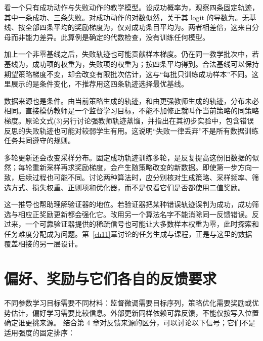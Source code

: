 看一个只有成功动作与失败动作的教学模型。设成功概率为，观察四条固定轨迹，其中一条成功、三条失败。对成功动作的对数似然，关于其 logit 的导数为。无基线、按全部四条平均的奖励梯度为，仅对成功条目平均为。两者相差倍，这来自分母而非能力差异。此算例是确定的代数检查，没有训练任何模型。

加上一个非零基线之后，失败轨迹也可能贡献样本梯度。仍在同一教学批次中，若基线为，成功项的权重为，失败项的权重为；按四条平均得到。合法基线可以保持期望策略梯度不变，却会改变有限批次估计，这与“每批只训练成功样本”不同。这里展示的是条件变化，不推荐用这四条轨迹选择最优基线。

数据来源也是条件。由当前策略生成的轨迹，和由更强教师生成的轨迹，分布未必相同。直接模仿教师是一个监督学习目标，不能不加修正就叫作当前策略的同策略梯度。原论文式(3)另行讨论强教师轨迹蒸馏，并指出在其初步实验中，包含错误反思的失败轨迹也可能对较弱学生有用\cite{self-challenging-2506}。这说明“失败一律丢弃”不是所有数据训练任务共同遵守的规则。

多轮更新还会改变采样分布。固定成功轨迹训练多轮，是反复提高这份旧数据的似然；每轮重新采样再求奖励梯度，会产生随策略改变的新数据。即使第一步方向一致，后续过程也可能不同。讨论两种算法时，应分别核对生成策略、采样频率、筛选方式、损失权重、正则项和优化器，而不是仅看它们是否都使用二值奖励。

这一推导也帮助理解验证器的地位。若验证器把某种错误轨迹误判为成功，成功筛选与相应正奖励更新都会强化它。改用另一个算法名字不能消除同一反馈错误。反过来，一个可靠验证器提供的稀疏信号也可能让大多数样本权重为零，此时探索和任务难度分配成为问题。第~\ref{ch11}章讨论的任务生成与课程，正是与这里的数据覆盖相接的另一层设计。

\section{偏好、奖励与它们各自的反馈要求}
\label{sec:ch10-reward}

\begin{sloppypar}
不同参数学习目标需要不同材料：监督微调需要目标序列，策略优化需要奖励或优势估计，偏好学习需要比较信息。外部更新同样依赖可靠反馈，不能仅按写入位置确定谁更挑来源。
结合第 4 章对反馈来源的区分，可以讨论以下信号；它们不是适用强度的固定排序：
\end{sloppypar}

